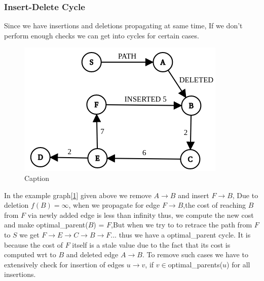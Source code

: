 \documentclass[a4paper]{article}
\begin{document}
\subsubsection{Insert-Delete Cycle}
Since we have insertions and deletions propagating at same time, If we don't perform enough checks we can get into cycles for certain cases. 
\begin{figure}[H]
    \centering
    \includegraphics[scale=0.45]{img/ins_del_cycle.png}
    \caption{Caption}
    \label{fig:insert_delete_cycle}
\end{figure}
In the example graph[\ref{fig:insert_delete_cycle}] given above we remove $A \rightarrow B$ and insert $F \rightarrow B$, Due to deletion $f(B) = \infty$, when we propagate for edge $F \rightarrow B$,the cost of reaching $B$ from $F$ via newly added edge is less than infinity thus, we compute the new cost and make optimal\_parent($B$) = $F$,But when we try to to retrace the path from $F$ to $S$ we get $F\rightarrow E\rightarrow C\rightarrow B\rightarrow F...$ thus we have a optimal\_parent cycle. It is because the cost of $F$ itself is a stale value due to the fact that its cost is computed wrt to $B$ and deleted edge $A \rightarrow B$. To remove such cases we have to extensively check for insertion of edges $u \rightarrow v$, if $v \in $optimal\_parents($u$) for all insertions.
\end{document}

